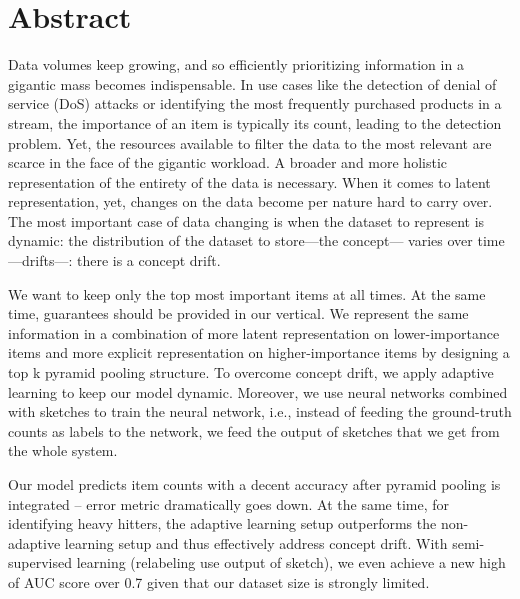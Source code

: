 \section*{Abstract}

Data volumes keep growing, and so efficiently prioritizing information in a gigantic mass becomes indispensable. In use cases like the detection of denial of service (DoS) attacks or identifying the most frequently purchased products in a stream, the importance of an item is typically its count, leading to the detection problem. Yet, the resources available to filter the data to the most relevant are scarce in the face of the gigantic workload. A broader and more holistic representation of the entirety of the data is necessary. When it comes to latent representation, yet, changes on the data become per nature hard to carry over. The most important case of data changing is when the dataset to represent is dynamic: the distribution of the dataset to store—the concept— varies over time—drifts—: there is a concept drift.


We want to keep only the top most important items at all times. At the same time, guarantees should be provided in our vertical. We represent the same information in a combination of more latent representation on lower-importance items and more explicit representation on higher-importance items by designing a top k pyramid pooling structure. To overcome concept drift, we apply adaptive learning to keep our model dynamic. Moreover, we use neural networks combined with sketches to train the neural network, i.e., instead of feeding the ground-truth counts as labels to the network, we feed the output of sketches that we get
from the whole system.

Our model predicts item counts with a decent accuracy after pyramid pooling is integrated -- error metric dramatically goes down. At the same time, for identifying heavy hitters, the adaptive learning setup outperforms the non-adaptive learning setup and thus effectively address concept drift. With semi-supervised learning (relabeling use output of sketch), we even achieve a new high of AUC score over 0.7 given that our dataset size is strongly limited.

